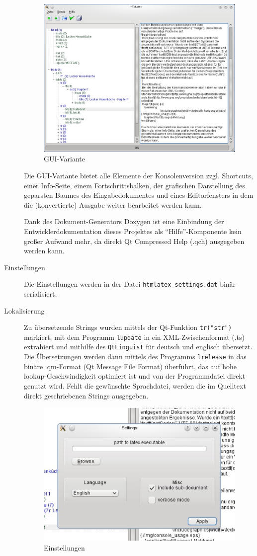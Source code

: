 \documentclass[	a4paper,		%
		titlepage, 		%
		fontsize=12pt		%
		]{scrartcl} 		%
\begin{document}
\begin{description}
 \begin{figure} [H]
    \centering
	\includegraphics[width=.7\textwidth, keepaspectratio]{./img/GUI.eps}
    \caption{GUI-Variante}
\end{figure}
Die GUI-Variante bietet alle Elemente der Konsolenversion zzgl. Shortcuts, einer Info-Seite, einem Fortschrittsbalken, der grafischen Darstellung des geparsten Baumes des Eingabedokumentes und eines Editorfensters in dem die (konvertierte) Ausgabe weiter bearbeitet werden kann.

Dank des Dokument-Generators Doxygen ist eine Einbindung der Entwicklerdokumentation dieses Projektes als ``Hilfe''-Komponente kein großer Aufwand mehr, da direkt Qt Compressed Help (.qch) ausgegeben werden kann.

 \item[Einstellungen] Die Einstellungen werden in der Datei \texttt{htmlatex\_settings.dat} binär serialisiert.

 \item[Lokalisierung] Zu übersetzende Strings wurden mittels der Qt-Funktion \texttt{tr("str")}  markiert, mit dem Programm \texttt{lupdate} in ein XML-Zwischenformat (.ts) extrahiert und mithilfe des \texttt{QtLinguist} für deutsch und englisch übersetzt. Die Übersetzungen werden dann mittels des Programms \texttt{lrelease} in das binäre .qm-Format (Qt Message File Format) überführt, das auf hohe lookup-Ge\-schwin\-dig\-keit optimiert ist und von der Programmdatei direkt genutzt wird. Fehlt die gewünschte Sprachdatei, werden die im Quelltext direkt geschriebenen Strings ausgegeben.
  \begin{figure} [H]
    \centering
	\includegraphics[width=.5\textwidth, keepaspectratio]{./img/GUI_settings.eps}
    \caption{Einstellungen}
\end{figure}


\end{description}
\end{document}

